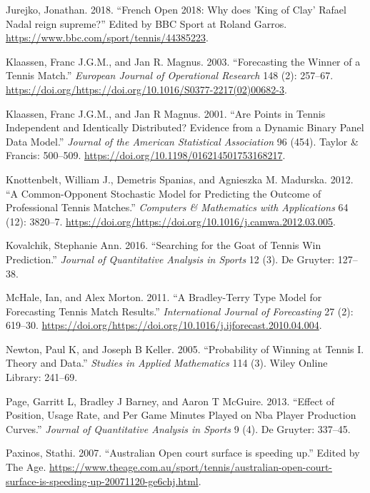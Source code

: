 \documentclass[]{article}
\begin{document}
\leavevmode\hypertarget{ref-bbc2018}{}%
Jurejko, Jonathan. 2018. ``French Open 2018: Why does 'King of Clay'
Rafael Nadal reign supreme?'' Edited by BBC Sport at Roland Garros.
\url{https://www.bbc.com/sport/tennis/44385223}.

\leavevmode\hypertarget{ref-klaassen2003}{}%
Klaassen, Franc J.G.M., and Jan R. Magnus. 2003. ``Forecasting the
Winner of a Tennis Match.'' \emph{European Journal of Operational
Research} 148 (2): 257--67.
\url{https://doi.org/https://doi.org/10.1016/S0377-2217(02)00682-3}.

\leavevmode\hypertarget{ref-klaassen2001}{}%
Klaassen, Franc J.G.M., and Jan R Magnus. 2001. ``Are Points in Tennis
Independent and Identically Distributed? Evidence from a Dynamic Binary
Panel Data Model.'' \emph{Journal of the American Statistical
Association} 96 (454). Taylor \& Francis: 500--509.
\url{https://doi.org/10.1198/016214501753168217}.

\leavevmode\hypertarget{ref-knottenbelt2012}{}%
Knottenbelt, William J., Demetris Spanias, and Agnieszka M. Madurska.
2012. ``A Common-Opponent Stochastic Model for Predicting the Outcome of
Professional Tennis Matches.'' \emph{Computers \& Mathematics with
Applications} 64 (12): 3820--7.
\url{https://doi.org/https://doi.org/10.1016/j.camwa.2012.03.005}.

\leavevmode\hypertarget{ref-kovalchik2016}{}%
Kovalchik, Stephanie Ann. 2016. ``Searching for the Goat of Tennis Win
Prediction.'' \emph{Journal of Quantitative Analysis in Sports} 12 (3).
De Gruyter: 127--38.

\leavevmode\hypertarget{ref-mchale2011}{}%
McHale, Ian, and Alex Morton. 2011. ``A Bradley-Terry Type Model for
Forecasting Tennis Match Results.'' \emph{International Journal of
Forecasting} 27 (2): 619--30.
\url{https://doi.org/https://doi.org/10.1016/j.ijforecast.2010.04.004}.

\leavevmode\hypertarget{ref-newton2005}{}%
Newton, Paul K, and Joseph B Keller. 2005. ``Probability of Winning at
Tennis I. Theory and Data.'' \emph{Studies in Applied Mathematics} 114
(3). Wiley Online Library: 241--69.

\leavevmode\hypertarget{ref-page2013}{}%
Page, Garritt L, Bradley J Barney, and Aaron T McGuire. 2013. ``Effect
of Position, Usage Rate, and Per Game Minutes Played on Nba Player
Production Curves.'' \emph{Journal of Quantitative Analysis in Sports} 9
(4). De Gruyter: 337--45.

\leavevmode\hypertarget{ref-theage2007}{}%
Paxinos, Stathi. 2007. ``Australian Open court surface is speeding up.''
Edited by The Age.
\url{https://www.theage.com.au/sport/tennis/australian-open-court-surface-is-speeding-up-20071120-ge6chj.html}.
\end{document}
